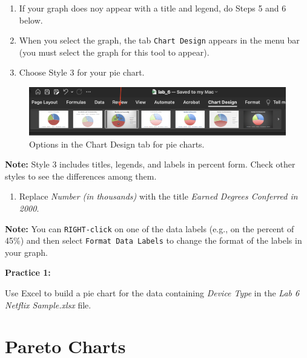 \documentclass[
]{book}
\providecommand{\tightlist}{%
  \setlength{\itemsep}{0pt}\setlength{\parskip}{0pt}}
\begin{document}
\begin{enumerate}
\def\labelenumi{\arabic{enumi}.}
\setcounter{enumi}{3}
\tightlist
\item
  If your graph does noy appear with a title and legend, do Steps 5 and 6 below.
\item
  When you select the graph, the tab \texttt{Chart\ Design} appears in the menu bar (you must select the graph for this tool to appear).
\item
  Choose Style 3 for your pie chart.
\end{enumerate}

\begin{figure}

{\centering \includegraphics[width=1\linewidth]{pie-chart-design} 

}

\caption{Options in the Chart Design tab for pie charts.}\label{fig:pie-chart-design}
\end{figure}

\textbf{Note:} Style 3 includes titles, legends, and labels in percent form. Check other styles to see the differences among them.

\begin{enumerate}
\def\labelenumi{\arabic{enumi}.}
\setcounter{enumi}{6}
\tightlist
\item
  Replace \emph{Number (in thousands)} with the title \emph{Earned Degrees Conferred in 2000}.
\end{enumerate}

\textbf{Note:} You can \texttt{RIGHT-click} on one of the data labels (e.g., on the percent of 45\%) and then select \texttt{Format\ Data\ Labels} to change the format of the labels in your graph.

\textbf{Practice 1:}

Use Excel to build a pie chart for the data containing \emph{Device Type} in the \emph{Lab 6 Netflix Sample.xlsx} file.

\hypertarget{pareto-charts}{%
\section{Pareto Charts}\label{pareto-charts}}
\end{document}

